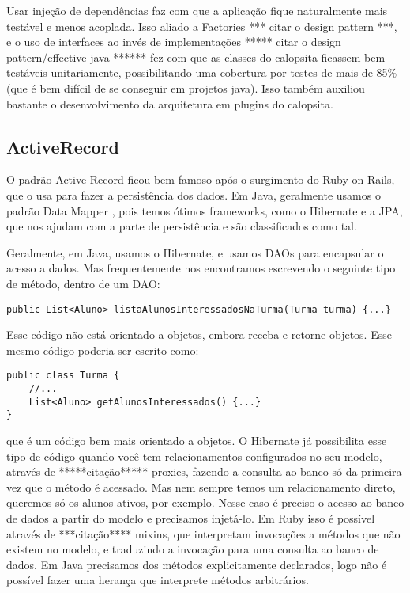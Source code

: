 Usar injeção de dependências faz com que a aplicação fique naturalmente mais testável e menos acoplada. Isso aliado a
Factories *** citar o design pattern ***, e o uso de interfaces ao invés de implementações ***** citar o design 
pattern/effective java ****** fez com que as classes do calopsita ficassem bem testáveis unitariamente, possibilitando 
uma cobertura por testes de mais de 85\% (que é bem difícil de se conseguir em projetos java). Isso também auxiliou bastante
o desenvolvimento da arquitetura em plugins do calopsita.

\subsection{ActiveRecord}

O padrão Active Record \cite{activeRecord} ficou bem famoso após o surgimento do Ruby on Rails\cite{RoR}, que o usa 
para fazer a persistência dos dados. Em Java, geralmente usamos o padrão Data Mapper \cite{dataMapper}, pois temos 
ótimos frameworks, como o Hibernate e a JPA, que nos ajudam com a parte de persistência e são classificados como tal.

Geralmente, em Java, usamos o Hibernate, e usamos DAOs\cite{dao} para encapsular 
o acesso a dados. Mas frequentemente nos encontramos escrevendo o seguinte tipo de método, dentro de um DAO:

\begin{lstlisting}
public List<Aluno> listaAlunosInteressadosNaTurma(Turma turma) {...}
\end{lstlisting}

Esse código não está orientado a objetos, embora receba e retorne objetos. Esse mesmo código poderia ser escrito como:

\begin{lstlisting}
public class Turma {
	//...
	List<Aluno> getAlunosInteressados() {...}
}
\end{lstlisting}

que é um código bem mais orientado a objetos. O Hibernate já possibilita esse tipo de código quando você
tem relacionamentos configurados no seu modelo, através de *****citação***** proxies, fazendo a consulta ao banco
só da primeira vez que o método é acessado. Mas nem sempre temos um relacionamento direto, queremos só os alunos
ativos, por exemplo. Nesse caso é preciso o acesso ao banco de dados a partir do modelo e precisamos injetá-lo.
Em Ruby isso é possível através de ***citação**** mixins, que interpretam invocações a métodos que não existem no
modelo, e traduzindo a invocação para uma consulta ao banco de dados. Em Java precisamos dos métodos explicitamente
declarados, logo não é possível fazer uma herança que interprete métodos arbitrários.

